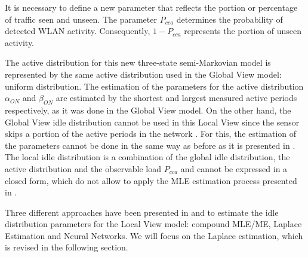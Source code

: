 It is necessary to define a new parameter that reflects the portion or percentage of traffic seen and unseen. The parameter $P_{cca}$ determines the probability of detected \acs{WLAN} activity. Consequently, $1-P_{cca}$ represents the portion of unseen activity.

The active distribution for this new three-state semi-Markovian model is represented by the same active distribution used in the Global View model: uniform distribution. The estimation of the parameters for the active distribution $\alpha_{ON}$ and $\beta_{ON}$ are estimated by the shortest and largest measured active periods respectively, as it was done in the Global View model. On the other hand, the Global View idle distribution cannot be used in this Local View since the sensor skips a portion of the active periods in the network \cite{marcello}. For this, the estimation of the parameters cannot be done in the same way as before as it is presented in \cite{marcello}. The local idle distribution is a combination of the global idle distribution, the active distribution and the observable load $P_{cca}$ and cannot be expressed in a closed form, which do not allow to apply the \acs{MLE} estimation process presented in \cite{marcello-thesis}.

Three different approaches have been presented in \cite{marcello} and \cite{marcello-thesis} to estimate the idle distribution parameters for the Local View model: compound \acs{MLE}/\acs{ME}, Laplace Estimation and Neural Networks. We will focus on the Laplace estimation, which is revised in the following section.